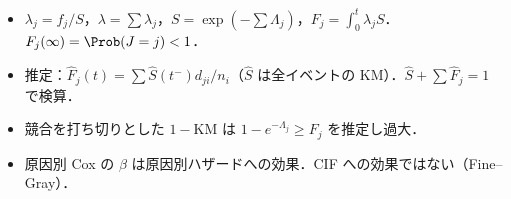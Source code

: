 \begin{summarybox}
\begin{itemize}
\item $\lambda_j=f_j/S$，$\lambda=\sum\lambda_j$，$S=\exp(-\sum\Lambda_j)$，$F_j=\int_0^t\lambda_jS$．$F_j(\infty)=\Prob(J=j)<1$．
\item 推定：$\hat F_j(t)=\sum\hat S(t^-)d_{ji}/n_i$（$\hat S$ は全イベントの KM）．$\hat S+\sum\hat F_j=1$ で検算．
\item 競合を打ち切りとした $1-\mathrm{KM}$ は $1-e^{-\Lambda_j}\ge F_j$ を推定し過大．
\item 原因別 Cox の $\beta$ は原因別ハザードへの効果．CIF への効果ではない（Fine--Gray）．
\end{itemize}
\end{summarybox}
